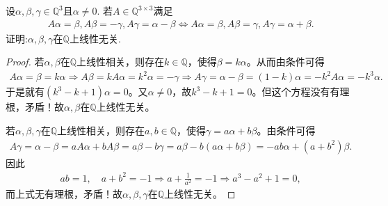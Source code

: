 \documentclass[../../main.tex]{subfiles}
\begin{document}
\begin{proposition}\label{proposition:有理数域上线性变换与向量组线性无关的命题}
设$\alpha, \beta, \gamma \in \mathbb{Q}^3$且$\alpha \neq 0$. 若$A \in \mathbb{Q}^{3 \times 3}$满足
\begin{align*}
A\alpha =\beta ,A\beta =-\gamma ,A\gamma =\alpha -\beta \Longleftrightarrow A\alpha =\beta ,A\beta =\gamma ,A\gamma =\alpha +\beta .
\end{align*}
证明:$\alpha, \beta, \gamma$在$\mathbb{Q}$上线性无关.
\end{proposition}
\begin{proof}
若$\alpha, \beta$在$\mathbb{Q}$上线性相关，则存在$k\in \mathbb{Q}$，使得$\beta =k\alpha$。从而由条件可得
\begin{align*}
A\alpha =\beta =k\alpha \Longrightarrow A\beta =kA\alpha =k^2\alpha =-\gamma 
\Longrightarrow A\gamma =\alpha -\beta =\left( 1-k \right) \alpha =-k^2A\alpha =-k^3\alpha .
\end{align*}
于是就有$\left( k^3-k+1 \right) \alpha =0$。又$\alpha \ne 0$，故$k^3-k+1=0$。但这个方程没有有理根，矛盾！故$\alpha, \beta$在$\mathbb{Q}$上线性无关。

若$\alpha, \beta, \gamma$在$\mathbb{Q}$上线性相关，则存在$a,b\in \mathbb{Q}$，使得$\gamma =a\alpha +b\beta$。由条件可得
\begin{align*}
A\gamma =\alpha -\beta =aA\alpha +bA\beta =a\beta -b\gamma =a\beta -b\left( a\alpha +b\beta \right) =-ab\alpha +\left( a+b^2 \right) \beta .
\end{align*}
因此
\begin{align*}
ab=1,\quad a+b^2=-1\Longrightarrow a+\frac{1}{a^2}=-1\Longrightarrow a^3-a^2+1=0,
\end{align*}
而上式无有理根，矛盾！故$\alpha, \beta, \gamma$在$\mathbb{Q}$上线性无关。
\end{proof}
\end{document}

